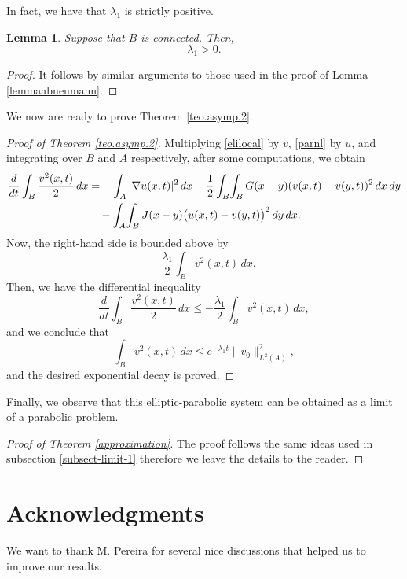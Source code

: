 \documentclass[reqno]{amsart}
\numberwithin{equation}{section}
\newtheorem{lemma}[theorem]{Lemma}
\begin{document}
In fact, we have that $\lambda_1$ is strictly positive.

\begin{lemma}\label{lemmaabneumann.2} Suppose that $B$ is connected. Then,
$$
\lambda_1 > 0.
$$
\end{lemma}

\begin{proof}
It follows by similar arguments to those used in the proof of Lemma \ref{lemmaabneumann}.
\end{proof}

We now are ready to prove Theorem \ref{teo.asymp.2}.

\begin{proof}[Proof of Theorem \ref{teo.asymp.2}]
Multiplying \eqref{elilocal} by $v$, \eqref{parnl} by $u$, and integrating over $B$ and $A$ respectively, after some computations, we obtain
\begin{align}
\frac{d}{dt}\int_B \frac{v^2(x,t)}{2}\,dx
&= -\int_A |\nabla u(x,t)|^2\,dx
   -\frac12 \int_B\!\int_B G(x-y)(v(x,t)-v(y,t))^2\,dx\,dy \notag\\
&\quad
   -\int_A\!\int_B J(x-y)\bigl(u(x,t)-v(y,t)\bigr)^2\,dy\,dx.
\label{energy-final.66} \notag
\end{align}
Now, the right-hand side is bounded above by
\[
- \frac{\lambda_1}2 \int_B v^2(x,t)\,dx.
\]
Then, we have the differential
inequality
\[
\frac{d}{dt}\int_B \frac{v^2(x,t)}{2}\,dx
\le - \frac{\lambda_1}2 \int_B v^2(x,t)\,dx,
\]
and we conclude that
\[
\int_B v^2(x,t)\,dx
\le e^{- \lambda_1 t}\|v_0\|_{L^2(A)}^2,
\]
and the desired exponential decay is proved.
\end{proof}


Finally, we observe that this elliptic-parabolic system can be obtained as a limit
of a parabolic problem.

\begin{proof}[Proof of Theorem \ref{approximation}]
The proof follows the same ideas used in subsection \ref{subsect-limit-1} therefore we leave the details to the reader.  
\end{proof}


\section*{Acknowledgments}
	
	We want to thank M. Pereira for several nice discussions that helped us to improve our results.
	
\end{document}
